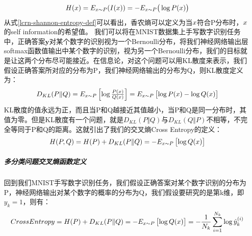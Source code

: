 \documentclass[UTF8]{article}
\begin{document}
\begin{equation}
\begin{aligned}
H(\boldmath{x})=E_{\boldmath{x} \sim P}(I(\boldmath{x}))=-E_{\boldmath{x} \sim P}\big(\log{P(\boldmath{x})}\big)
\end{aligned}
\label{lcrn-shannon-entropy-def}
\end{equation}
从式\ref{lcrn-shannon-entropy-def}可以看出，香农熵可以定义为当$\boldmath{x}$符合P分布时，$\boldmath{x}$的self information的希望值。\newline
我们可以将在MNIST数据集上手写数字识别任务中，正确答案$\boldsymbol{y}$对某个数字的识别视为一个Bernoulli分布，将我们神经网络输出层softmax函数值输出中某个数字的识别，视为另一个Bernoulli分布，我们的目标就是让这两个分布尽可能接近。在信息论，对这个问题可以用KL散度来表示，我们假设正确答案所对应的分布为P，我们神经网络输出的分布为Q，则KL散度定义为：
\begin{equation}
\begin{aligned}
D_{KL}(P \Vert Q)=E_{\boldmath{x} \sim P}\begin{bmatrix}
\log{  \frac{P(x)}{Q(x)}  }
\end{bmatrix}=E_{\boldmath{x} \sim P}\begin{bmatrix}
\log{P(x)} - \log{Q(x)}
\end{bmatrix}
\end{aligned}
\label{lcrn-kl-divergence-def}
\end{equation}
KL散度的值永远为正，而且当P和Q越接近其值越小，当P和Q是同一分布时，其值为零。但是KL散度有一个问题，就是$D_{KL}(P \Vert Q)$与$D_{KL}(Q \Vert P)$不相等，不完全等同于P和Q的距离。这就引出了我们的交叉熵Cross Entropy的定义：
\begin{equation}
\begin{aligned}
H(P,Q)=H(P) + D_{KL}(P \Vert Q)=-E_{\boldmath{x} \sim P}\begin{bmatrix}
\log{Q(x)}
\end{bmatrix}
\end{aligned}
\label{lcrn-crossentropy-def}
\end{equation}
\subparagraph{多分类问题交叉熵函数定义}
回到我们MNIST手写数字识别任务，我们假设正确答案对某个数字识别的分布为P，神经网络输出对某个数字的概率的分布为Q，我们假设要研究的是第k维，即$y_k=1$，则有：
\begin{equation}
\begin{aligned}
CrossEntropy=H(P) + D_{KL}(P \Vert Q)=-E_{\boldmath{x} \sim P}\begin{bmatrix}
\log{Q(x)}
\end{bmatrix}=-\frac{1}{N_k}\sum_{i=1}^{N_k}\log{\hat{y}^{(i)}_k}
\end{aligned}
\label{lcrn-mnist-crossentropy-def}
\end{equation}
\end{document}
